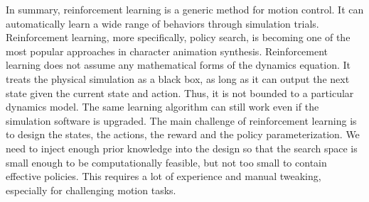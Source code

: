 In summary, reinforcement learning is a generic method for motion control. It can automatically learn a wide range of behaviors through simulation trials. Reinforcement learning, more specifically, policy search, is becoming one of the most popular approaches in character animation synthesis. Reinforcement learning does not assume any mathematical forms of the dynamics equation. It treats the physical simulation as a black box, as long as it can output the next state given the current state and action. Thus, it is not bounded to a particular dynamics model. The same learning algorithm can still work even if the simulation software is upgraded. The main challenge of reinforcement learning is to design the states, the actions, the reward and the policy parameterization. We need to inject enough prior knowledge into the design so that the search space is small enough to be computationally feasible, but not too small to contain effective policies. This requires a lot of experience and manual tweaking, especially for challenging motion tasks. 
